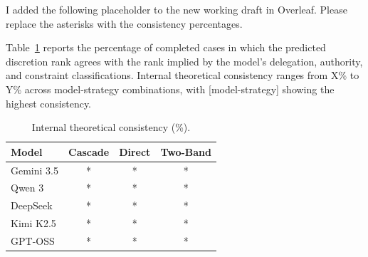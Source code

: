 \documentclass[11pt]{article}
\begin{document}
I added the following placeholder to the new working draft in Overleaf. Please replace the asterisks with the consistency percentages.

Table~\ref{tab:consistency} reports the percentage of completed cases in which
the predicted discretion rank agrees with the rank implied by the model's
delegation, authority, and constraint classifications. Internal theoretical consistency ranges from X\% to Y\% across model-strategy combinations, with [model-strategy] showing the highest consistency.

\begin{table}[htbp]
\centering
\caption{Internal theoretical consistency (\%).}
\label{tab:consistency}
\scriptsize
\begin{tabular}{@{}lccc@{}}
\toprule
\textbf{Model} & \textbf{Cascade} & \textbf{Direct} & \textbf{Two-Band} \\
\midrule
Gemini 3.5 & * & * & * \\
Qwen 3     & * & * & * \\
DeepSeek   & * & * & * \\
Kimi K2.5  & * & * & * \\
GPT-OSS    & * & * & * \\
\bottomrule
\end{tabular}
\end{table}
\end{document}

